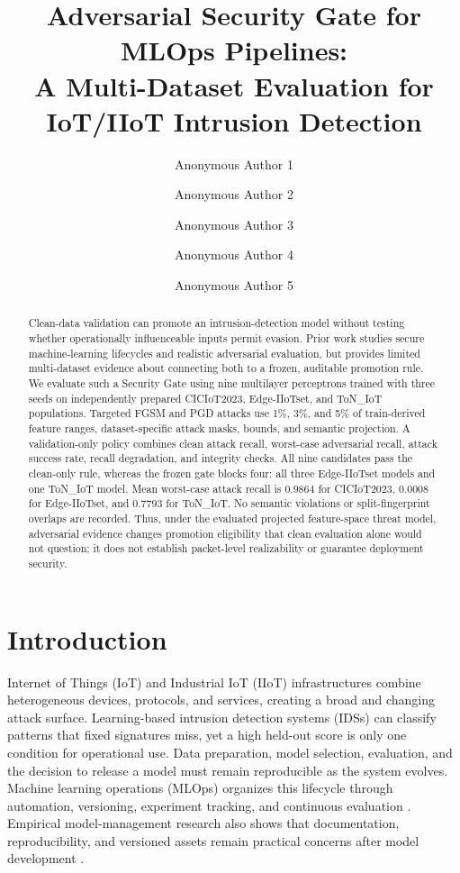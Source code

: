 \documentclass[runningheads]{llncs}
\begin{document}
\title{Adversarial Security Gate for MLOps Pipelines:\\A Multi-Dataset Evaluation for IoT/IIoT Intrusion Detection}
\author{Anonymous Author 1 \and Anonymous Author 2 \and
Anonymous Author 3 \and Anonymous Author 4 \and
Anonymous Author 5}
\maketitle

\begin{abstract}
Clean-data validation can promote an intrusion-detection model without testing whether operationally influenceable inputs permit evasion. Prior work studies secure machine-learning lifecycles and realistic adversarial evaluation, but provides limited multi-dataset evidence about connecting both to a frozen, auditable promotion rule. We evaluate such a Security Gate using nine multilayer perceptrons trained with three seeds on independently prepared CICIoT2023, Edge-IIoTset, and ToN\_IoT populations. Targeted FGSM and PGD attacks use 1\%, 3\%, and 5\% of train-derived feature ranges, dataset-specific attack masks, bounds, and semantic projection. A validation-only policy combines clean attack recall, worst-case adversarial recall, attack success rate, recall degradation, and integrity checks. All nine candidates pass the clean-only rule, whereas the frozen gate blocks four: all three Edge-IIoTset models and one ToN\_IoT model. Mean worst-case attack recall is $0.9864$ for CICIoT2023, $0.0008$ for Edge-IIoTset, and $0.7793$ for ToN\_IoT. No semantic violations or split-fingerprint overlaps are recorded. Thus, under the evaluated projected feature-space threat model, adversarial evidence changes promotion eligibility that clean evaluation alone would not question; it does not establish packet-level realizability or guarantee deployment security.
\end{abstract}

\section{Introduction}
Internet of Things (IoT) and Industrial IoT (IIoT) infrastructures combine heterogeneous devices, protocols, and services, creating a broad and changing attack surface. Learning-based intrusion detection systems (IDSs) can classify patterns that fixed signatures miss, yet a high held-out score is only one condition for operational use. Data preparation, model selection, evaluation, and the decision to release a model must remain reproducible as the system evolves. Machine learning operations (MLOps) organizes this lifecycle through automation, versioning, experiment tracking, and continuous evaluation \cite{kreuzberger2023mlops}. Empirical model-management research also shows that documentation, reproducibility, and versioned assets remain practical concerns after model development \cite{latendresse2025management}.
\end{document}
